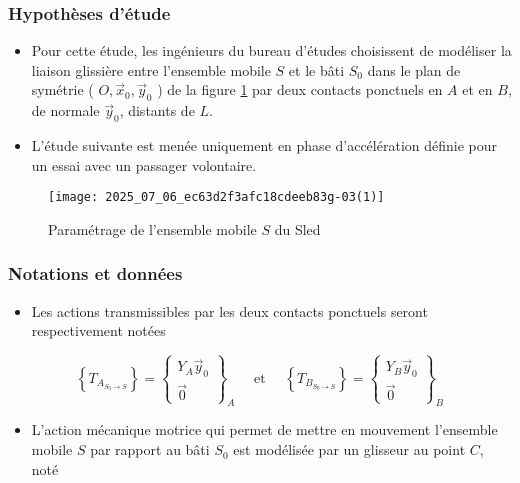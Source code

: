 \subsubsection*{Hypothèses d'étude}
\begin{itemize}
  \item Pour cette étude, les ingénieurs du bureau d'études choisissent de modéliser la liaison glissière entre l'ensemble mobile $S$ et le bâti $S_{0}$ dans le plan de symétrie ( $O, \vec{x}_{0}, \vec{y}_{0}$ ) de la figure \ref{ccs_mp_2022_fig_05} par deux contacts ponctuels en $A$ et en $B$, de normale $\vec{y}_{0}$, distants de $L$.
  \item L'étude suivante est menée uniquement en phase d'accélération définie pour un essai avec un passager volontaire.
\end{itemize}

\begin{figure}[!h]
\centering
\texttt{[image: 2025\_07\_06\_ec63d2f3afc18cdeeb83g-03(1)]}
\caption{\label{ccs_mp_2022_fig_05}Paramétrage de l'ensemble mobile $S$ du Sled}
\end{figure}



\subsubsection*{Notations et données}
\begin{itemize}
  \item Les actions transmissibles par les deux contacts ponctuels seront respectivement notées
\end{itemize}

$$
\left\{T_{A_{S_{0} \rightarrow S}}\right\}=\left\{\begin{array}{c}
Y_{A} \vec{y}_{0} \\
\overrightarrow{0}
\end{array}\right\}_{A} \quad \text { et } \quad\left\{T_{B_{S_{0} \rightarrow S}}\right\}=\left\{\begin{array}{c}
Y_{B} \vec{y}_{0} \\
\overrightarrow{0}
\end{array}\right\}_{B}
$$

\begin{itemize}
  \item L'action mécanique motrice qui permet de mettre en mouvement l'ensemble mobile $S$ par rapport au bâti $S_{0}$ est modélisée par un glisseur au point $C$, noté
\end{itemize}

